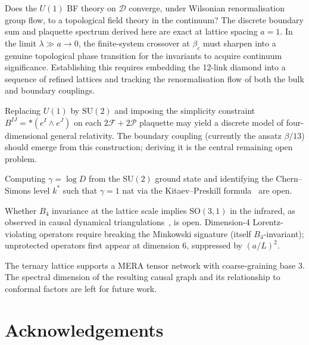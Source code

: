 \documentclass[12pt, a4paper]{article}
\theoremstyle{plain}
\theoremstyle{definition}
\theoremstyle{remark}
\newcommand{\CD}{\mathscr{D}}
\newcommand{\FS}{\mathcal{F}}
\newcommand{\PS}{\mathcal{P}}
\newcommand{\Cstar}{\beta_c}
\begin{document}
\begin{description}[style=nextline]
  \item[(O1) Continuum limit.]
    Does the $U(1)$ BF theory on $\CD$ converge, under Wilsonian
    renormalisation group flow, to a topological field theory in
    the continuum?
    The discrete boundary sum and plaquette spectrum derived here
    are exact at lattice spacing $a = 1$.
    In the limit $\lambda \gg a \to 0$, the finite-system crossover
    at $\Cstar$ must sharpen into a genuine topological phase
    transition for the invariants to acquire continuum significance.
    Establishing this requires embedding the 12-link diamond
    into a sequence of refined lattices and tracking the
    renormalisation flow of both the bulk and boundary couplings.
  \item[(O2) $\mathrm{SU}(2)$ upgrade and Plebanski constraint.]
    Replacing $U(1)$ by $\mathrm{SU}(2)$ and imposing the
    simplicity constraint $B^{IJ}=\ast(e^I\wedge e^J)$ on each
    $2\FS+2\PS$ plaquette may yield a discrete model of
    four-dimensional general relativity.
    The boundary coupling (currently the ansatz $\beta/13$) should
    emerge from this construction; deriving it is the central
    remaining open problem.
  \item[(O3) Topological entanglement entropy.]
    Computing $\gamma=\log D$ from the $\mathrm{SU}(2)$ ground state
    and identifying the Chern--Simons level $k^*$ such that $\gamma=1$
    nat via the Kitaev--Preskill formula~\cite{KitaevPreskill2006}
    are open.
  \item[(O4) Lorentz symmetry restoration.]
    Whether $B_4$ invariance at the lattice scale implies
    $\mathrm{SO}(3,1)$ in the infrared, as observed in causal
    dynamical triangulations~\cite{Ambjorn2004}, is open.
    Dimension-4 Lorentz-violating operators require breaking the
    Minkowski signature (itself $B_4$-invariant); unprotected
    operators first appear at dimension 6, suppressed by $(a/L)^2$.
  \item[(O5) Spectral dimension of the MERA graph.]
    The ternary lattice supports a MERA tensor network with
    coarse-graining base 3.
    The spectral dimension of the resulting causal graph and its
    relationship to conformal factors are left for future work.
\end{description}

\section*{Acknowledgements}
\end{document}
